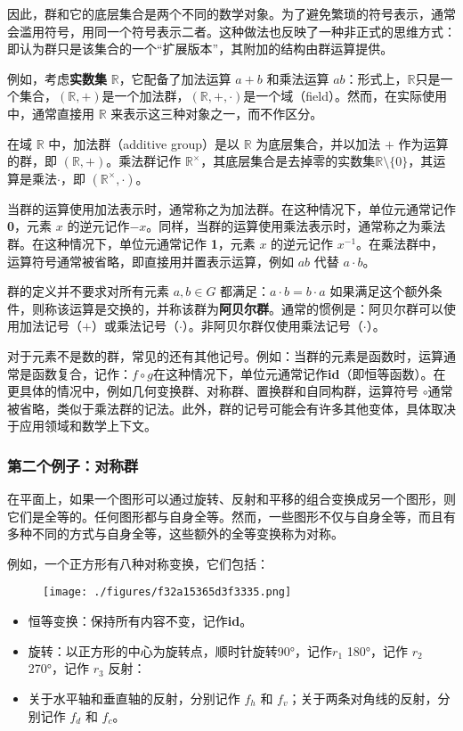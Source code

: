 因此，群和它的底层集合是两个不同的数学对象。为了避免繁琐的符号表示，通常会滥用符号，用同一个符号表示二者。这种做法也反映了一种非正式的思维方式：即认为群只是该集合的一个“扩展版本”，其附加的结构由群运算提供。  

例如，考虑\textbf{实数集} \( \mathbb{R} \)，它配备了加法运算 \( a + b \) 和乘法运算 \( ab \)：形式上，\( \mathbb{R} \)只是一个集合，\( (\mathbb{R}, +) \)是一个加法群，\( (\mathbb{R}, +, \cdot) \)是一个域（field）。然而，在实际使用中，通常直接用 \( \mathbb{R} \) 来表示这三种对象之一，而不作区分。  

在域 \( \mathbb{R} \) 中，加法群（additive group）是以 \( \mathbb{R} \) 为底层集合，并以加法 \( + \) 作为运算的群，即 \( (\mathbb{R}, +) \)。乘法群记作 \( \mathbb{R}^{\times} \)，其底层集合是去掉零的实数集\( \mathbb{R}\setminus \{0\} \)，其运算是乘法\( \cdot \)，即 \( (\mathbb{R}^\times, \cdot) \)。

当群的运算使用加法表示时，通常称之为加法群。在这种情况下，单位元通常记作\textbf{0}，元素 \( x \) 的逆元记作\(-x\)。同样，当群的运算使用乘法表示时，通常称之为乘法群。在这种情况下，单位元通常记作 \textbf{1}，元素 \( x \) 的逆元记作 \( x^{-1} \)。在乘法群中，运算符号通常被省略，即直接用并置表示运算，例如 \( ab \) 代替 \( a \cdot b \)。  

群的定义并不要求对所有元素 \( a, b \in G \) 都满足：\(a \cdot b = b \cdot a\) 如果满足这个额外条件，则称该运算是交换的，并称该群为\textbf{阿贝尔群}。通常的惯例是：阿贝尔群可以使用加法记号（\( + \)）或乘法记号（\( \cdot \)）。非阿贝尔群仅使用乘法记号（\( \cdot \)）。

对于元素不是数的群，常见的还有其他记号。例如：当群的元素是函数时，运算通常是函数复合，记作：\(f \circ g\)在这种情况下，单位元通常记作\textbf{id}（即恒等函数）。在更具体的情况中，例如几何变换群、对称群、置换群和自同构群，运算符号 \( \circ \)通常被省略，类似于乘法群的记法。此外，群的记号可能会有许多其他变体，具体取决于应用领域和数学上下文。
\subsubsection{第二个例子：对称群 }
在平面上，如果一个图形可以通过旋转、反射和平移的组合变换成另一个图形，则它们是全等的。任何图形都与自身全等。然而，一些图形不仅与自身全等，而且有多种不同的方式与自身全等，这些额外的全等变换称为对称。  

例如，一个正方形有八种对称变换，它们包括：
\begin{figure}[ht]
\centering
\texttt{[image: ./figures/f32a15365d3f3335.png]}
\caption{} \label{fig_GroupM_2}
\end{figure}
\begin{itemize}
\item 恒等变换：保持所有内容不变，记作\textbf{id}。  
\item 旋转：以正方形的中心为旋转点，顺时针旋转90°，记作\( r_1 \) 180°，记作 \( r_2 \)270°，记作 \( r_3 \) 反射：  
\item 关于水平轴和垂直轴的反射，分别记作 \( f_h \) 和 \( f_v \)；关于两条对角线的反射，分别记作 \( f_d \) 和 \( f_c \)。
\end{itemize}